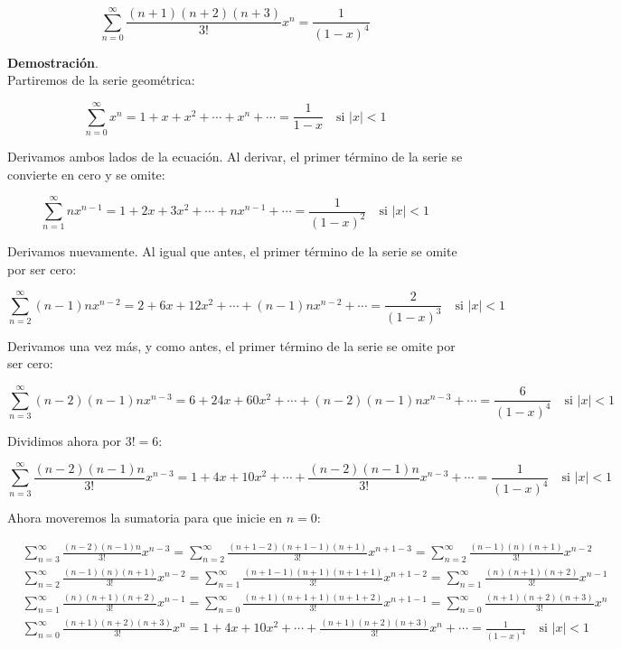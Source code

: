 \documentclass{article}
\begin{document}
    $$
    \sum_{n=0}^{\infty} \frac{(n+1)(n+2)(n+3)}{3!} x^{n}=\frac{1}{(1-x)^{4}}
    $$

    \textbf{Demostración}.\\

    Partiremos de la serie geométrica:

    $$
    \sum_{n=0}^{\infty} x^{n}=1+x+x^{2}+\cdots+x^{n}+\cdots=\frac{1}{1-x} \quad \text {si } |x|<1
    $$

    Derivamos ambos lados de la ecuación. Al derivar, el primer término de la serie se convierte en cero y se omite:

    $$
    \sum_{n=1}^{\infty} n x^{n-1}=1+2 x+3 x^{2}+\cdots+n x^{n-1}+\cdots=\frac{1}{(1-x)^{2}} \quad \text {si } |x|<1
    $$

    Derivamos nuevamente. Al igual que antes, el primer término de la serie se omite por ser cero:

    $$
    \sum_{n=2}^{\infty} (n-1) n x^{n-2}=2+6 x+12 x^{2}+\cdots+(n-1) n x^{n-2}+\cdots=\frac{2}{(1-x)^{3}} \quad \text {si } |x|<1
    $$

    Derivamos una vez más, y como antes, el primer término de la serie se omite por ser cero:

    $$
    \sum_{n=3}^{\infty} (n-2)(n-1) n x^{n-3}=6+24 x+60 x^{2}+\cdots+(n-2)(n-1) n x^{n-3}+\cdots=\frac{6}{(1-x)^{4}} \quad \text {si } |x|<1
    $$

    Dividimos ahora por $3!=6$:

    $$
    \sum_{n=3}^{\infty} \frac{(n-2)(n-1) n}{3!} x^{n-3}=1+4 x+10 x^{2}+\cdots+\frac{(n-2)(n-1) n}{3!} x^{n-3}+\cdots=\frac{1}{(1-x)^{4}} \quad \text {si } |x|<1
    $$

    Ahora moveremos la sumatoria para que inicie en $n=0$:

    $$
    \begin{aligned}
    & \sum_{n=3}^{\infty} \frac{(n-2)(n-1) n}{3!} x^{n-3}=\sum_{n=2}^{\infty} \frac{(n+1-2)(n+1-1)(n+1)}{3!} x^{n+1-3}=\sum_{n=2}^{\infty} \frac{(n-1)(n)(n+1)}{3!} x^{n-2} \\
    & \sum_{n=2}^{\infty} \frac{(n-1)(n)(n+1)}{3!} x^{n-2}=\sum_{n=1}^{\infty} \frac{(n+1-1)(n+1)(n+1+1)}{3!} x^{n+1-2}=\sum_{n=1}^{\infty} \frac{(n)(n+1)(n+2)}{3!} x^{n-1} \\
    & \sum_{n=1}^{\infty} \frac{(n)(n+1)(n+2)}{3!} x^{n-1}=\sum_{n=0}^{\infty} \frac{(n+1)(n+1+1)(n+1+2)}{3!} x^{n+1-1}=\sum_{n=0}^{\infty} \frac{(n+1)(n+2)(n+3)}{3!} x^{n} \\
    & \sum_{n=0}^{\infty} \frac{(n+1)(n+2)(n+3)}{3!} x^{n}=1+4 x+10 x^{2}+\cdots+\frac{(n+1)(n+2)(n+3)}{3!} x^{n}+\cdots=\frac{1}{(1-x)^{4}} \quad \text {si } |x|<1
    \end{aligned}
    $$
\end{document}
